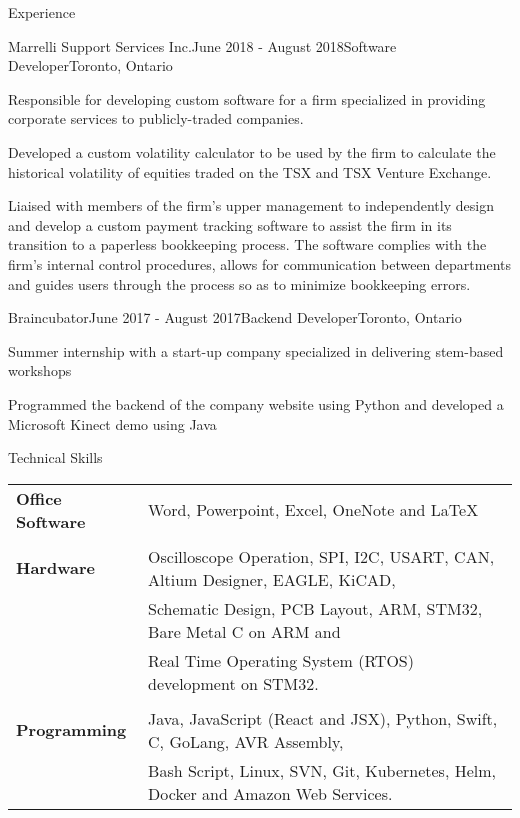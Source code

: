 \documentclass{resume} %
\begin{document}
\begin{rSection}{Experience}
\begin{rSubsection}{Marrelli Support Services Inc.}{June 2018 - August
    2018}{Software Developer}{Toronto, Ontario}
\item Responsible for developing custom software for a firm specialized in providing corporate
  services to publicly-traded companies.
\item Developed a custom volatility calculator to be used by the firm to calculate the historical
  volatility of equities traded on the TSX and TSX Venture Exchange.
\item Liaised with members of the firm’s upper management to independently design and
  develop a custom payment tracking software to assist the firm in its transition to a paperless
  bookkeeping process. The software complies with the firm’s internal control procedures,
  allows for communication between departments and guides users through the process so as
  to minimize bookkeeping errors.
\end{rSubsection}
\begin{rSubsection}{Braincubator}{June 2017 - August 2017}{Backend
    Developer}{Toronto, Ontario}
\item Summer internship with a start-up company specialized in delivering stem-based
  workshops
\item Programmed the backend of the company website using Python and developed a Microsoft
  Kinect demo using Java
\end{rSubsection}

\end{rSection}


\begin{rSection}{Technical Skills}

\begin{tabular}{ @{} >{\bfseries}l @{\hspace{6ex}} l }
Office Software & Word, Powerpoint, Excel, OneNote and \LaTeX\\ \\

Hardware & Oscilloscope Operation, SPI, I2C, USART, CAN, Altium Designer, EAGLE, KiCAD, \\ & Schematic Design, PCB Layout, ARM, STM32, Bare Metal C on ARM and \\ & Real Time Operating System (RTOS) development on STM32. \\ \\

Programming & Java, JavaScript (React and JSX), Python, Swift, C, GoLang, AVR Assembly,\\ & Bash Script, Linux, SVN, Git, Kubernetes, Helm, Docker and Amazon Web Services. \\


\end{tabular}

\end{rSection}
\end{document}
